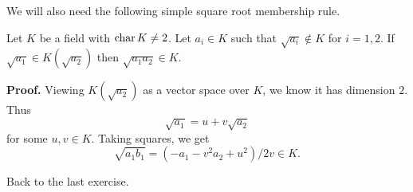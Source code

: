 We will also need the following simple square root membership rule.

\begin{llem} \label{llem:sqrts:in}
Let $K$ be a field with \(\fchar K \neq 2\).
Let \(a_i \in K\) such that \(\sqrt{a_i}\notin K\) for \(i=1,2\).
If \(\sqrt{a_1}\in K(\sqrt{a_2})\) then \(\sqrt{a_1 a_2} \in K\).
\end{llem}
\textbf{Proof.}
Viewing \(K(\sqrt{a_2})\) as a vector space over $K$, we know 
it has dimension $2$. Thus 
\begin{equation*}
\sqrt{a_1} = u + v \sqrt{a_2}
\end{equation*}
for some \(u,v\in K\). Taking squares, we get
\begin{equation*}
 \sqrt{a_1 b_1} = \left(-a_1 - v^2a_2 + u^2\right)/2v \in K.
\end{equation*}
\proofend

\iffalse
\begin{llem} \label{llem:sqrt:exts}
Let $K$ be a field with \(\fchar K \neq 2\).
If \(a,b\in K\) and \(\sqrt{a}\in K(\sqrt{b})\setminus K\) 
then \(\sqrt{ab}\in K\).
\end{llem}
\textbf{Proof.}
Viewing \(K(\sqrt{b})\) as a vector space over $K$
for some \(k_1,k_2\in K\),
we have the following linear combination 
with simple derivations:
\begin{eqnarray*}
\sqrt{a} &=& k_1+k_2\sqrt{b} \\
k_1 &=& k_2\sqrt{b} - \sqrt{a} \\
k_1^2 &=& k_2^2 b - 2k_2\sqrt{ab} + a \\
\sqrt{ab} &=& \left(a + k_2^2 b - k_1^2\right) / 2k_2 \in K.
\end{eqnarray*}
\proofend
\fi

Back to the last exercise.

